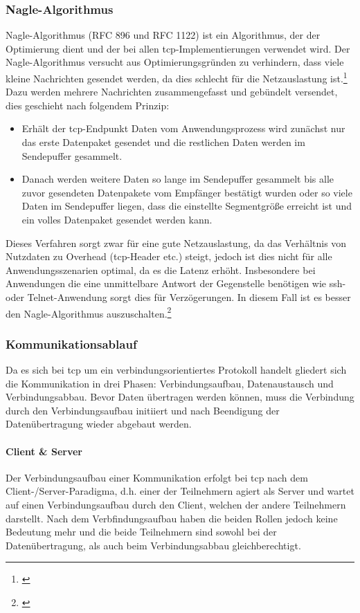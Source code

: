 \subsubsection{Nagle-Algorithmus}
Nagle-Algorithmus (RFC 896 und RFC 1122) ist ein Algorithmus, der der Optimierung dient und der bei allen \gls{tcp}-Implementierungen verwendet wird. Der Nagle-Algorithmus versucht aus Optimierungsgründen zu verhindern, dass viele kleine Nachrichten gesendet werden, da dies schlecht für die Netzauslastung ist.\footnote{\citep[vgl.][Grundkurs Datenkommunikation, Seite 198]{Mandl.GrundkursDatenkommunikation}\label{note45}} \newline
Dazu werden mehrere Nachrichten zusammengefasst und gebündelt versendet, dies geschieht nach folgendem Prinzip:
\begin{itemize}
	\item{Erhält der \gls{tcp}-Endpunkt Daten vom Anwendungsprozess wird zunächst nur das erste Datenpaket gesendet und die restlichen Daten werden im Sendepuffer gesammelt.}
	\item{Danach werden weitere Daten so lange im Sendepuffer gesammelt bis alle zuvor gesendeten Datenpakete vom Empfänger bestätigt wurden oder so viele Daten im Sendepuffer liegen, dass die einstellte Segmentgröße erreicht ist und ein volles Datenpaket gesendet werden kann.}
\end{itemize}
Dieses Verfahren sorgt zwar für eine gute Netzauslastung, da das Verhältnis von Nutzdaten zu Overhead (\gls{tcp}-Header etc.) steigt, jedoch ist dies nicht für alle Anwendungsszenarien optimal, da es die Latenz erhöht. Insbesondere bei Anwendungen die eine unmittelbare Antwort der Gegenstelle benötigen wie \gls{ssh}- oder Telnet-Anwendung sorgt dies für Verzögerungen. In diesem Fall ist es besser den Nagle-Algorithmus auszuschalten.\footnote{\citep[vgl.][Grundkurs Datenkommunikation, Seite 198 f.]{Mandl.GrundkursDatenkommunikation}\label{note65}}
\subsubsection{Kommunikationsablauf}
Da es sich bei \gls{tcp} um ein verbindungsorientiertes Protokoll handelt gliedert sich die Kommunikation in drei Phasen: Verbindungsaufbau, Datenaustausch und Verbindungsabbau. Bevor Daten übertragen werden können, muss die Verbindung durch den Verbindungsaufbau initiiert und nach Beendigung der Datenübertragung wieder abgebaut werden. 
\paragraph{Client \& Server}
Der Verbindungsaufbau einer Kommunikation erfolgt bei \gls{tcp} nach dem Client-/Server-Paradigma, d.h. einer der Teilnehmern agiert als Server und wartet auf einen Verbindungsaufbau durch den Client, welchen der andere Teilnehmern darstellt. \newline
Nach dem Verbfindungsaufbau haben die beiden Rollen jedoch keine Bedeutung mehr und die beide Teilnehmern sind sowohl bei der Datenübertragung, als auch beim Verbindungsabbau gleichberechtigt.
